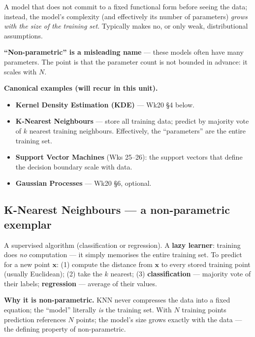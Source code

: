 \documentclass[11pt, a4paper]{article}
\begin{document}
\begin{defbox}
A model that does not commit to a fixed functional form before seeing the data; instead, the model's complexity (and effectively its number of parameters) \emph{grows with the size of the training set}. Typically makes no, or only weak, distributional assumptions.
\end{defbox}

\textbf{``Non-parametric'' is a misleading name} — these models often have many parameters. The point is that the parameter count is not bounded in advance: it scales with $N$.

\textbf{Canonical examples (will recur in this unit).}
\begin{itemize}
  \item \textbf{Kernel Density Estimation (KDE)} — Wk20 §4 below.
  \item \textbf{K-Nearest Neighbours} — store all training data; predict by majority vote of $k$ nearest training neighbours. Effectively, the ``parameters'' are the entire training set.
  \item \textbf{Support Vector Machines} (Wks 25--26): the support vectors that define the decision boundary scale with data.
  \item \textbf{Gaussian Processes} — Wk20 §6, optional.
\end{itemize}

\subsection{K-Nearest Neighbours --- a non-parametric exemplar}

\begin{defbox}
A supervised algorithm (classification or regression). A \textbf{lazy learner}: training does \emph{no} computation --- it simply memorises the entire training set. To predict for a new point $\mathbf{x}$: (1) compute the distance from $\mathbf{x}$ to every stored training point (usually Euclidean); (2) take the $k$ nearest; (3) \textbf{classification} --- majority vote of their labels; \textbf{regression} --- average of their values.
\end{defbox}

\textbf{Why it is non-parametric.} KNN never compresses the data into a fixed equation; the ``model'' literally \emph{is} the training set. With $N$ training points prediction references $N$ points; the model's size grows exactly with the data --- the defining property of non-parametric.
\end{document}
